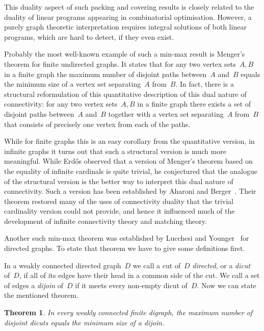\documentclass[reqno, 12pt]{amsart}
\numberwithin{equation}{section}
\numberwithin{figure}{section}
\theoremstyle{plain}
\newtheorem{theorem}[thm]{Theorem}
\theoremstyle{definition}
\begin{document}
This duality aspect of such packing and covering results is closely related to the duality of linear programs appearing in combinatorial optimisation.
However, a purely graph theoretic interpretation requires integral solutions of both linear programs, which are hard to detect, if they even exist.

Probably the most well-known example of such a min-max result is Menger's theorem for finite undirected graphs. 
It states that for any two vertex sets~${A, B}$ in a finite graph 
the maximum number of disjoint paths between~$A$ and~$B$  
equals the minimum size of a vertex set separating~$A$ from~$B$. 
In fact, there is a structural reformulation of this quantitative description of this dual nature of connectivity: 
for any two vertex sets~${A, B}$ in a finite graph 
there exists a set of disjoint paths between~$A$ and~$B$ 
together with a vertex set separating~$A$ from~$B$ 
that consists of precisely one vertex from each of the paths. 

While for finite graphs this is an easy corollary from the quantitative version, in infinite graphs it turns out that such a structural version is much more meaningful. 
While Erd{\H{o}}s observed that a version of Menger's theorem based on the equality of infinite cardinals is quite trivial, he conjectured that the analogue of the structural version is the better way to interpret this dual nature of connectivity. 
Such a version has been established by Aharoni and Berger~\cite{inf-menger}. 
Their theorem restored many of the uses of connectivity duality that the trivial cardinality version could not provide, 
and hence it influenced much of the development of infinite connectivity theory and matching theory. 


Another such min-max theorem was established by Lucchesi and Younger~\cite{lucc-young_paper} for directed graphs. 
To state that theorem we have to give some definitions first. 

In a weakly connected directed graph~$D$ we call a cut of~$D$ \emph{directed}, or a \emph{dicut} of~$D$, if all of its edges have their head in a common side of the cut. 
We call a set of edges a \emph{dijoin} of~$D$ if it meets every non-empty dicut of~$D$. 
Now we can state the mentioned theorem. 

\begin{theorem}
    \label{thm:LY-fin}
    \cite{lucc-young_paper}
    In every weakly connected finite digraph, the maximum number of disjoint dicuts equals the minimum size of a dijoin.
\end{theorem}
\end{document}
